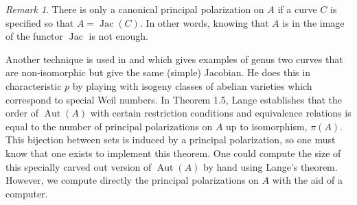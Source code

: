 \documentclass[12pt,reqno]{amsart}
\DeclareMathOperator{\Aut}{Aut}
\DeclareMathOperator{\Jac}{Jac}
\newcommand{\Q}{\mathbb{Q}}
\theoremstyle{definition}
\theoremstyle{remark}
\newtheorem*{remark}{Remark}
\begin{document}
\begin{remark} There is only a canonical principal polarization on $A$ if a curve $C$ is specified so that $A = \Jac(C).$ In other words, knowing that $A$ is in the image of the functor $\Jac$ is not enough. \end{remark}

Another technique is used in \cite{howe1} and \cite{howe2} which gives examples of genus two curves that are non-isomorphic but give the same (simple) Jacobian. He does this in characteristic $p$ by playing with isogeny classes of abelian varieties which correspond to special Weil numbers. In \cite{several} Theorem 1.5, Lange establishes that the order of $\Aut(A)$ with certain restriction conditions and equivalence relations is equal to the number of principal polarizations on $A$ up to isomorphism, $\pi(A)$. This bijection between sets is induced by a principal polarization, so one must know that one exists to implement this theorem. One could compute the size of this specially carved out version of $\Aut(A)$ by hand using Lange's theorem. However, we compute directly the principal polarizations on $A$ with the aid of a computer.




\end{document}
